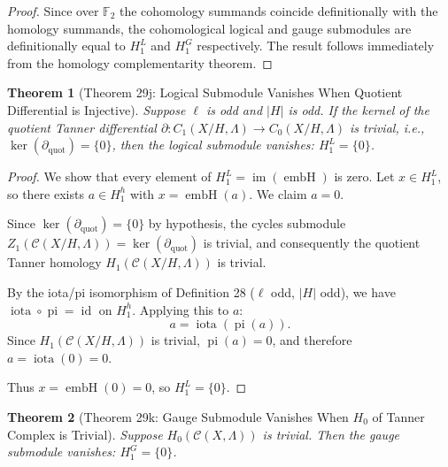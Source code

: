 \documentclass[11pt]{article}
\theoremstyle{plain}
\newtheorem*{theorem}{Theorem}
\theoremstyle{definition}
\theoremstyle{remark}
\renewcommand{\ker}{\operatorname{ker}}
\begin{document}
\begin{proof}
Since over $\mathbb{F}_2$ the cohomology summands coincide definitionally with the homology summands, the cohomological logical and gauge submodules are definitionally equal to $H_1^L$ and $H_1^G$ respectively. The result follows immediately from the homology complementarity theorem.
\end{proof}

\begin{theorem}[Theorem 29j: Logical Submodule Vanishes When Quotient Differential is Injective]
Suppose $\ell$ is odd and $|H|$ is odd. If the kernel of the quotient Tanner differential $\partial : C_1(X/H, \Lambda) \to C_0(X/H, \Lambda)$ is trivial, i.e., $\ker(\partial_{\mathrm{quot}}) = \{0\}$, then the logical submodule vanishes: $H_1^L = \{0\}$.
\end{theorem}

\begin{proof}
We show that every element of $H_1^L = \operatorname{im}(\operatorname{embH})$ is zero. Let $x \in H_1^L$, so there exists $a \in H_1^h$ with $x = \operatorname{embH}(a)$. We claim $a = 0$.

Since $\ker(\partial_{\mathrm{quot}}) = \{0\}$ by hypothesis, the cycles submodule $Z_1(\mathcal{C}(X/H,\Lambda)) = \ker(\partial_{\mathrm{quot}})$ is trivial, and consequently the quotient Tanner homology $H_1(\mathcal{C}(X/H, \Lambda))$ is trivial.

By the iota/pi isomorphism of Definition 28 ($\ell$ odd, $|H|$ odd), we have $\operatorname{iota} \circ \operatorname{pi} = \operatorname{id}$ on $H_1^h$. Applying this to $a$:
\[
  a = \operatorname{iota}(\operatorname{pi}(a)).
\]
Since $H_1(\mathcal{C}(X/H,\Lambda))$ is trivial, $\operatorname{pi}(a) = 0$, and therefore $a = \operatorname{iota}(0) = 0$.

Thus $x = \operatorname{embH}(0) = 0$, so $H_1^L = \{0\}$.
\end{proof}

\begin{theorem}[Theorem 29k: Gauge Submodule Vanishes When $H_0$ of Tanner Complex is Trivial]
Suppose $H_0(\mathcal{C}(X,\Lambda))$ is trivial. Then the gauge submodule vanishes: $H_1^G = \{0\}$.
\end{theorem}
\end{document}
